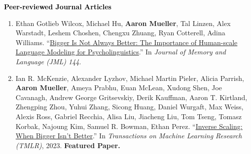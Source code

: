 \documentclass[10pt]{article}
\renewcommand{\subsection}[1]{\textcolor{black}{#1}}
\newcommand{\halfblankline}{\quad\vspace{-0.5\baselineskip}\pagebreak[3]}
\providecommand*\titlelink[2]{\href{#1}{\textcolor{accent}{#2}}}
\begin{document}
	\subsection{\textbf{Peer-reviewed Journal Articles}}
	\begin{enumerate}[leftmargin=*, topsep=0pt, itemsep=0.25ex, partopsep=0ex, parsep=1ex, label=J\arabic*., ref=J\arabic*]

	\item Ethan Gotlieb Wilcox, Michael Hu, \textbf{Aaron Mueller}, Tal Linzen, Alex Warstadt, Leshem Choshen, Chengxu Zhuang, Ryan Cotterell, Adina Williams. ``\titlelink{https://osf.io/preprints/psyarxiv/rfwgd}{Bigger Is Not Always Better: The Importance of Human-scale Language Modeling for Psycholinguistics}.'' In \emph{Journal of Memory and Language (JML) 144}.

	\item Ian R. McKenzie, Alexander Lyzhov, Michael Martin Pieler, Alicia Parrish, \textbf{Aaron Mueller}, Ameya Prabhu, Euan McLean, Xudong Shen, Joe Cavanagh, Andrew George Gritsevskiy, Derik Kauffman, Aaron T. Kirtland, Zhengping Zhou, Yuhui Zhang, Sicong Huang, Daniel Wurgaft, Max Weiss, Alexis Ross, Gabriel Recchia, Alisa Liu, Jiacheng Liu, Tom Tseng, Tomasz Korbak, Najoung Kim, Samuel R. Bowman, Ethan Perez. ``\titlelink{https://arxiv.org/abs/2306.09479}{Inverse Scaling: When Bigger Isn't Better}.'' In \emph{Transactions on Machine Learning Research (TMLR)}, 2023. \textbf{\textcolor{accent}{Featured Paper.}}

	\end{enumerate}

	\halfblankline
\end{document}
